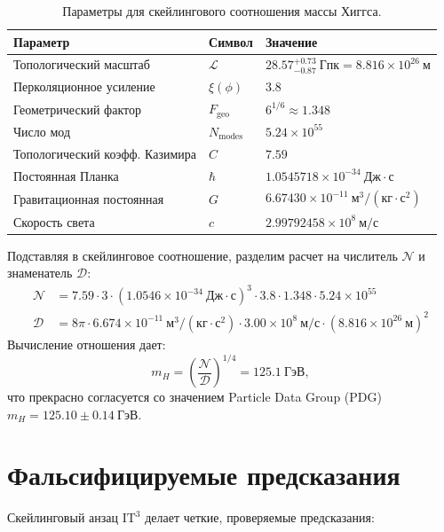 \documentclass[11pt,a4paper]{article}
\newcommand{\ITthree}{\ensuremath{\mathrm{IT}^3}}
\newcommand{\Ltop}{\ensuremath{\mathcal{L}}}
\newcommand{\xiPhi}{\ensuremath{\xi(\phi)}}
\newcommand{\Fgeo}{\ensuremath{F_{\mathrm{geo}}}}
\newcommand{\Nmodes}{\ensuremath{N_{\mathrm{modes}}}}
\begin{document}
\begin{table}[h]
\centering
\caption{Параметры для скейлингового соотношения массы Хиггса.}
\label{tab:params}
\begin{tabular}{lll}
\toprule
Параметр & Символ & Значение \\
\midrule
Топологический масштаб & $\Ltop$ & $28.57^{+0.73}_{-0.87}~\mathrm{Гпк} = 8.816 \times 10^{26}~\mathrm{м}$ \\
Перколяционное усиление & $\xiPhi$ & $3.8$ \\
Геометрический фактор & $\Fgeo$ & $6^{1/6} \approx 1.348$ \\
Число мод & $\Nmodes$ & $5.24 \times 10^{55}$ \\
Топологический коэфф. Казимира & $C$ & $7.59$ \\
Постоянная Планка & $\hbar$ & $1.0545718 \times 10^{-34}~\mathrm{Дж \cdot с}$ \\
Гравитационная постоянная & $G$ & $6.67430 \times 10^{-11}~\mathrm{м^3/(кг \cdot с^2)}$ \\
Скорость света & $c$ & $2.99792458 \times 10^8~\mathrm{м/с}$ \\
\bottomrule
\end{tabular}
\end{table}

Подставляя в скейлинговое соотношение, разделим расчет на числитель $\mathcal{N}$ и знаменатель $\mathcal{D}$:
\begin{align*}
\mathcal{N} &= 7.59 \cdot 3 \cdot (1.0546 \times 10^{-34}~\mathrm{Дж \cdot с})^3 \cdot 3.8 \cdot 1.348 \cdot 5.24 \times 10^{55} \\
\mathcal{D} &= 8\pi \cdot 6.674 \times 10^{-11}~\mathrm{м^3/(кг \cdot с^2)} \cdot 3.00 \times 10^8~\mathrm{м/с} \cdot (8.816 \times 10^{26}~\mathrm{м})^2
\end{align*}
Вычисление отношения дает:
\[
m_H = \left( \frac{\mathcal{N}}{\mathcal{D}} \right)^{1/4} = 125.1~\mathrm{ГэВ},
\]
что прекрасно согласуется со значением Particle Data Group (PDG) $m_H = 125.10 \pm 0.14~\mathrm{ГэВ}$.

\section{Фальсифицируемые предсказания}
\label{sec:predictions}

Скейлинговый анзац $\ITthree$ делает четкие, проверяемые предсказания:
\end{document}
